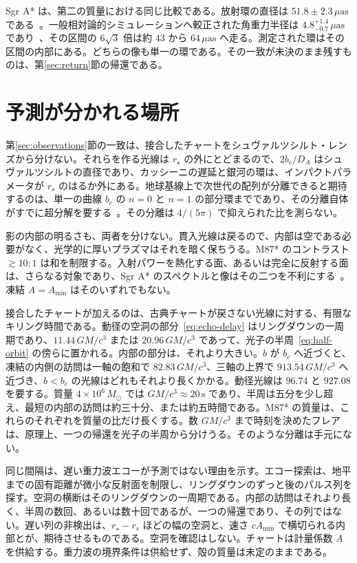 \documentclass[a4paper]{article}
\begin{document}
Sgr A* は、第二の質量における同じ比較である。放射環の直径は \(51.8\pm 2.3\,\mu\mathrm{as}\) である~\cite{EHT2022I}。一般相対論的シミュレーションへ較正された角重力半径は \(4.8^{+1.4}_{-0.7}\,\mu\mathrm{as}\) であり~\cite{EHT2022IV}、その区間の \(6\sqrt{3}\) 倍は約 \(43\) から \(64\,\mu\mathrm{as}\) へ走る。測定された環はその区間の内部にある。どちらの像も単一の環である。その一致が未決のまま残すものは、第\ref{sec:return}節の帰還である。

\section{予測が分かれる場所}
\label{sec:discriminants}

第\ref{sec:observations}節の一致は、接合したチャートをシュヴァルツシルト・レンズから分けない。それらを作る光線は \(r_\star\) の外にとどまるので、\(2b_c/D_A\) はシュヴァルツシルトの直径であり、カッシーニの遅延と銀河の環は、インパクトパラメータが \(r_s\) のはるか外にある。地球基線上で次世代の配列が分離できると期待するのは、単一の曲線 \(b_c\) の \(n=0\) と \(n=1\) の部分環までであり、その分離自体がすでに超分解を要する~\cite{Johnson2023}。その分離は \(4/(5\pi)\) で抑えられた比を測らない。

影の内部の明るさも、両者を分けない。貫入光線は戻るので、内部は空である必要がなく、光学的に厚いプラズマはそれを暗く保ちうる。M87* のコントラスト \(\gtrsim 10{:}1\) は和を制限する。入射パワーを熱化する面、あるいは完全に反射する面は、さらなる対象であり、Sgr A* のスペクトルと像はその二つを不利にする~\cite{EHT2022VI}。凍結 \(A=A_{\min}\) はそのいずれでもない。

接合したチャートが加えるのは、古典チャートが戻さない光線に対する、有限なキリング時間である。動径の空洞の部分~\eqref{eq:echo-delay} はリングダウンの一周期であり、\(11.44\,GM/c^3\) または \(20.96\,GM/c^3\) であって、光子の半周~\eqref{eq:half-orbit} の傍らに置かれる。内部の部分は、それより大きい。\(b\) が \(b_c\) へ近づくと、凍結の内側の訪問は一軸の飽和で \(82.83\,GM/c^3\)、三軸の上界で \(913.54\,GM/c^3\) へ近づき、\(b<b_c\) の光線はどれもそれより長くかかる。動径光線は \(96.74\) と \(927.08\) を要する。質量 \(4\times 10^6\,M_\odot\) では \(GM/c^3\approx 20\,\mathrm{s}\) であり、半周は五分を少し超え、最短の内部の訪問は約三十分、または約五時間である。M87* の質量は、これらのそれぞれを質量の比だけ長くする。数 \(GM/c^3\) まで時刻を決めたフレアは、原理上、一つの帰還を光子の半周から分けうる。そのような分離は手元にない。

同じ間隔は、遅い重力波エコーが予測ではない理由を示す。エコー探索は、地平までの固有距離が微小な反射面を制限し、リングダウンのずっと後のパルス列を探す。空洞の横断はそのリングダウンの一周期である。内部の訪問はそれより長く、半周の数回、あるいは数十回であるが、一つの帰還であり、その列ではない。遅い列の非検出は、\(r_\star-r_s\) ほどの幅の空洞と、速さ \(c A_{\min}\) で横切られる内部とが、期待させるものである。空洞を確認はしない。チャートは計量係数 \(A\) を供給する。重力波の境界条件は供給せず、殻の質量は未定のままである。
\end{document}
